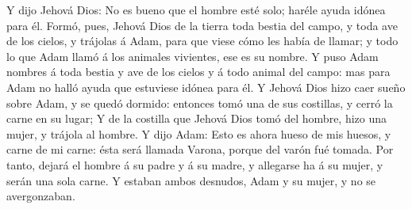 Y dijo Jehová Dios: No es bueno que el hombre esté solo; haréle ayuda idónea para él. 
Formó, pues, Jehová Dios de la tierra toda bestia del campo, y toda ave de los cielos, y trájolas á Adam, para que viese cómo les había de llamar; y todo lo que Adam llamó á los animales vivientes, ese es su nombre. 
Y puso Adam nombres á toda bestia y ave de los cielos y á todo animal del campo: mas para Adam no halló ayuda que estuviese idónea para él. 
Y Jehová Dios hizo caer sueño sobre Adam, y se quedó dormido: entonces tomó una de sus costillas, y cerró la carne en su lugar; 
Y de la costilla que Jehová Dios tomó del hombre, hizo una mujer, y trájola al hombre. 
Y dijo Adam: Esto es ahora hueso de mis huesos, y carne de mi carne: ésta será llamada Varona, porque del varón fué tomada. 
Por tanto, dejará el hombre á su padre y á su madre, y allegarse ha á su mujer, y serán una sola carne. 
Y estaban ambos desnudos, Adam y su mujer, y no se avergonzaban. 





